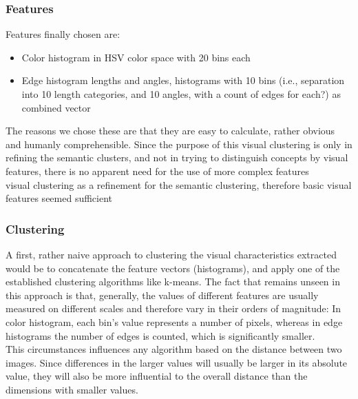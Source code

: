 \subsubsection{Features}
Features finally chosen are:
\begin{itemize}
\item{Color histogram} in HSV color space with 20 bins each
\item{Edge histogram} lengths and angles, histograms with 10 bins (i.e., separation into 10 length categories, and 10 angles, with a count of edges for each?) as combined vector 
\end{itemize}
The reasons we chose these are that they are easy to calculate, rather obvious and humanly comprehensible. Since the purpose of this visual clustering is only in refining the semantic clusters, and not in trying to distinguish concepts by visual features, there is no apparent need for the use of more complex features \\
visual clustering as a refinement for the semantic clustering, therefore basic visual features seemed sufficient 


\subsubsection{Clustering}
A first, rather naive approach to clustering the visual characteristics extracted would be to concatenate the feature vectors (histograms), and apply one of the established clustering algorithms like k-means.  The fact that remains unseen in this approach is that, generally, the values of different features are usually measured on different scales and therefore vary in their orders of magnitude: In color histogram, each bin's value represents a number of pixels, whereas in edge histograms the number of edges is counted, which is significantly smaller. \\
This circumstances influences any algorithm based on the distance between two images. Since differences in the larger values will usually be larger in its absolute value, they will also be more influential to the overall distance than the dimensions with smaller values.

